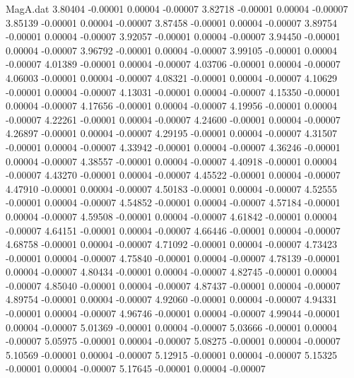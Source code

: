 \begin{filecontents}{MagA.dat}
   3.80404   -0.00001    0.00004   -0.00007
   3.82718   -0.00001    0.00004   -0.00007
   3.85139   -0.00001    0.00004   -0.00007
   3.87458   -0.00001    0.00004   -0.00007
   3.89754   -0.00001    0.00004   -0.00007
   3.92057   -0.00001    0.00004   -0.00007
   3.94450   -0.00001    0.00004   -0.00007
   3.96792   -0.00001    0.00004   -0.00007
   3.99105   -0.00001    0.00004   -0.00007
   4.01389   -0.00001    0.00004   -0.00007
   4.03706   -0.00001    0.00004   -0.00007
   4.06003   -0.00001    0.00004   -0.00007
   4.08321   -0.00001    0.00004   -0.00007
   4.10629   -0.00001    0.00004   -0.00007
   4.13031   -0.00001    0.00004   -0.00007
   4.15350   -0.00001    0.00004   -0.00007
   4.17656   -0.00001    0.00004   -0.00007
   4.19956   -0.00001    0.00004   -0.00007
   4.22261   -0.00001    0.00004   -0.00007
   4.24600   -0.00001    0.00004   -0.00007
   4.26897   -0.00001    0.00004   -0.00007
   4.29195   -0.00001    0.00004   -0.00007
   4.31507   -0.00001    0.00004   -0.00007
   4.33942   -0.00001    0.00004   -0.00007
   4.36246   -0.00001    0.00004   -0.00007
   4.38557   -0.00001    0.00004   -0.00007
   4.40918   -0.00001    0.00004   -0.00007
   4.43270   -0.00001    0.00004   -0.00007
   4.45522   -0.00001    0.00004   -0.00007
   4.47910   -0.00001    0.00004   -0.00007
   4.50183   -0.00001    0.00004   -0.00007
   4.52555   -0.00001    0.00004   -0.00007
   4.54852   -0.00001    0.00004   -0.00007
   4.57184   -0.00001    0.00004   -0.00007
   4.59508   -0.00001    0.00004   -0.00007
   4.61842   -0.00001    0.00004   -0.00007
   4.64151   -0.00001    0.00004   -0.00007
   4.66446   -0.00001    0.00004   -0.00007
   4.68758   -0.00001    0.00004   -0.00007
   4.71092   -0.00001    0.00004   -0.00007
   4.73423   -0.00001    0.00004   -0.00007
   4.75840   -0.00001    0.00004   -0.00007
   4.78139   -0.00001    0.00004   -0.00007
   4.80434   -0.00001    0.00004   -0.00007
   4.82745   -0.00001    0.00004   -0.00007
   4.85040   -0.00001    0.00004   -0.00007
   4.87437   -0.00001    0.00004   -0.00007
   4.89754   -0.00001    0.00004   -0.00007
   4.92060   -0.00001    0.00004   -0.00007
   4.94331   -0.00001    0.00004   -0.00007
   4.96746   -0.00001    0.00004   -0.00007
   4.99044   -0.00001    0.00004   -0.00007
   5.01369   -0.00001    0.00004   -0.00007
   5.03666   -0.00001    0.00004   -0.00007
   5.05975   -0.00001    0.00004   -0.00007
   5.08275   -0.00001    0.00004   -0.00007
   5.10569   -0.00001    0.00004   -0.00007
   5.12915   -0.00001    0.00004   -0.00007
   5.15325   -0.00001    0.00004   -0.00007
   5.17645   -0.00001    0.00004   -0.00007

\end{filecontents}
